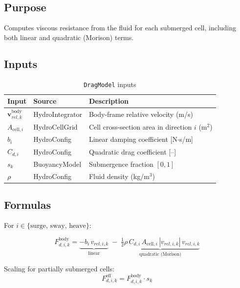 \documentclass[12pt,a4paper]{article}
\begin{document}
\subsection{Purpose}

Computes viscous resistance from the fluid for each submerged cell,
including both linear and quadratic (Morison) terms.

\subsection{Inputs}

\begin{table}[H]
  \centering
  \caption{\texttt{DragModel} inputs}
  \begin{tabularx}{\linewidth}{llX}
    \toprule
    \textbf{Input} & \textbf{Source} & \textbf{Description} \\
    \midrule
    $\mathbf{v}_{rel,k}^{\text{body}}$ & HydroIntegrator & Body-frame relative velocity (m/s) \\
    $A_{\text{cell},i}$ & HydroCellGrid & Cell cross-section area in direction $i$ (m$^2$) \\
    $b_i$ & HydroConfig & Linear damping coefficient [N$\cdot$s/m] \\
    $C_{d,i}$ & HydroConfig & Quadratic drag coefficient [--] \\
    $s_k$ & BuoyancyModel & Submergence fraction $[0,1]$ \\
    $\rho$ & HydroConfig & Fluid density (kg/m$^3$) \\
    \bottomrule
  \end{tabularx}
\end{table}

\subsection{Formulas}

For $i \in \{\text{surge, sway, heave}\}$:

\begin{equation}
  \boxed{
  F_{d,i,k}^{\text{body}}
    = \underbrace{-b_i\,v_{rel,i,k}}_{\text{linear}}
    \;-\;
    \underbrace{\tfrac{1}{2}\rho\,C_{d,i}\,A_{\text{cell},i}\,
      |v_{rel,i,k}|\,v_{rel,i,k}}_{\text{quadratic (Morison)}}
  }
  \label{eq:drag}
\end{equation}

Scaling for partially submerged cells:
\begin{equation}
  F_{d,i,k}^{\text{eff}} = F_{d,i,k}^{\text{body}} \cdot s_k
  \label{eq:drag_scaled}
\end{equation}
\end{document}
